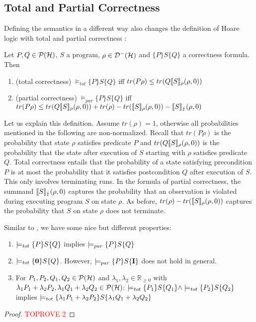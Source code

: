 \documentclass[a4paper,UKenglish,cleveref, autoref, thm-restate]{lipics-v2021}
\begin{document}
\subsection{Total and Partial Correctness}
Defining the semantics in a different way also changes the definition of Hoare logic with total and partial correctness \cite{floydHoareLogic}:
\begin{definition}
    Let $P,Q\in \mathcal{P}(\mathcal{H})$, $S$ a program, $\rho\in \mathcal{D}^- (\mathcal{H})$ and $\{P\} S \{Q\}$ a correctness formula. Then
    \begin{enumerate}
        \item (total correctness) $\models_{tot} \{P\} S \{Q\}$ iff $tr(P\rho)\leq tr(Q\llbracket S  \rrbracket_{\rho} (\rho,0))$
        \item (partial correctness) $\models_{par} \{P\} S \{Q\}$ iff $tr(P\rho)\leq tr(Q\llbracket S  \rrbracket_{\rho} (\rho,0))+ tr(\rho)- tr(\llbracket S  \rrbracket_{\rho} (\rho,0)) - \llbracket S  \rrbracket_{\lightning} (\rho,0)$
    \end{enumerate}
\end{definition}
Let us explain this definition. Assume $tr(\rho)=1$, otherwise all probabilities mentioned in the following are non-normalized.
Recall that $tr(P\rho)$ is the probability that state $\rho$ satisfies predicate $P$ and $tr(Q\llbracket S  \rrbracket_{\rho} (\rho,0))$ is the probability that the state after execution of $S$ starting with $\rho$ satisfies predicate $Q$. Total correctness entails that the probability of a state satisfying precondition $P$ is at most the probability that it satisfies postcondition $Q$ after execution of $S$. This only involves terminating runs.
In the formula of partial correctness, the summand $\llbracket S  \rrbracket_{\lightning} (\rho,0)$ captures the probability that an observation is violated during executing program $S$ on state $\rho$. As before, $tr(\rho)- tr(\llbracket S  \rrbracket_{\rho} (\rho,0))$ captures the probability that $S$ on state $\rho$ does not terminate.

Similar to \cite{floydHoareLogic}, we have some nice but different properties:
\begin{proposition}
    \begin{enumerate}
        \item $\models_{tot} \{P\} S \{Q\}$ implies $\models_{par} \{P\} S \{Q\}$
        \item $\models_{tot} \{\mathbf{0}\} S \{Q\}$. However, $\models_{par} \{P\} S \{\textbf{I}\}$ does not hold in general.
        \item For $P_1,P_2,Q_1,Q_2 \in \mathcal{P}(\mathcal{H})$ and $\lambda_1, \lambda_2 \in \mathbb{R}_{\geq 0}$ with $\lambda_1 P_1 + \lambda_2 P_2, \lambda_1 Q_1 + \lambda_2 Q_2 \in \mathcal{P}(\mathcal{H}) $:
        $\models_{tot} \{P_1\} S \{Q_1\} \land \models_{tot} \{P_2\} S \{Q_2\}$ implies $\models_{tot} \{\lambda_1 P_1 + \lambda_2 P_2\} S \{\lambda_1 Q_1 + \lambda_2 Q_2\} $
    \end{enumerate}
\end{proposition}
\begin{proof}\textcolor{red}{TOPROVE 2}\end{proof}
\end{document}
